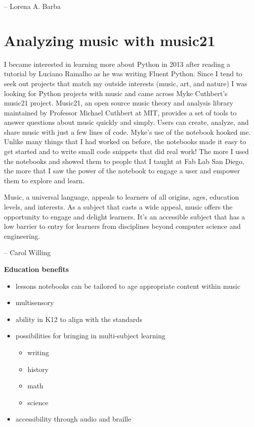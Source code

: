 \documentclass[]{book}
\providecommand{\tightlist}{%
  \setlength{\itemsep}{0pt}\setlength{\parskip}{0pt}}
\begin{document}
-- Lorena A. Barba

\section{Analyzing music with
music21}\label{analyzing-music-with-music21}

I became interested in learning more about Python in 2013 after reading
a tutorial by Luciano Ramalho as he was writing Fluent Python. Since I
tend to seek out projects that match my outside interests (music, art,
and nature) I was looking for Python projects with music and came across
Myke Cuthbert's music21 project. Music21, an open source music theory
and analysis library maintained by Professor Michael Cuthbert at MIT,
provides a set of tools to answer questions about music quickly and
simply. Users can create, analyze, and share music with just a few lines
of code. Myke's use of the notebook hooked me. Unlike many things that I
had worked on before, the notebooks made it easy to get started and to
write small code snippets that did real work! The more I used the
notebooks and showed them to people that I taught at Fab Lab San Diego,
the more that I saw the power of the notebook to engage a user and
empower them to explore and learn.

Music, a universal language, appeals to learners of all origins, ages,
education levels, and interests. As a subject that casts a wide appeal,
music offers the opportunity to engage and delight learners. It's an
accessible subject that has a low barrier to entry for learners from
disciplines beyond computer science and engineering.

-- Carol Willing

\textbf{Education benefits}

\begin{itemize}
\tightlist
\item
  lessons notebooks can be tailored to age appropriate content within
  music
\item
  multisensory
\item
  ability in K12 to align with the standards
\item
  possibilities for bringing in multi-subject learning

  \begin{itemize}
  \tightlist
  \item
    writing
  \item
    history
  \item
    math
  \item
    science
  \end{itemize}
\item
  accessibility through audio and braille
\end{itemize}
\end{document}
